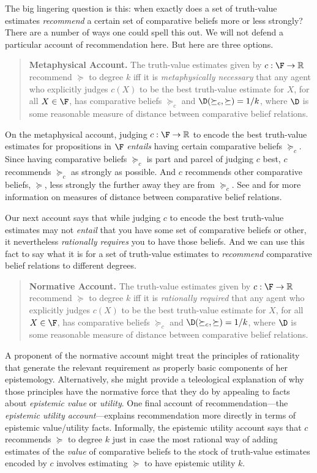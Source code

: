The big lingering question is this: when exactly does a set of truth-value estimates \textit{recommend} a certain set of comparative beliefs more or less strongly? There are a number of ways one could spell this out. We will not defend a particular account of recommendation here. But here are three options.
\begin{quote}
\textbf{Metaphysical Account.} The truth-value estimates given by $c:\F\rightarrow\mathbb{R}$ recommend $\succeq$ to degree $k$ iff it is \textit{metaphysically necessary} that any agent who explicitly judges $c(X)$ to be the best truth-value estimate for $X$, for all $X\in\F$, has comparative beliefs $\succeq_c$ and $\D(\succeq_c,\succeq)=1/k$, where $\D$ is some reasonable measure of distance between comparative belief relations. 
\end{quote}
On the metaphysical account, judging $c:\F\rightarrow\mathbb{R}$ to encode the best truth-value estimates for propositions in $\F$ \textit{entails} having certain comparative beliefs $\succeq_c$. Since having comparative beliefs $\succeq_c$ is part and parcel of judging $c$ best, $c$ recommends $\succeq_c$ as strongly as possible. And $c$ recommends other comparative beliefs, $\succeq$, less strongly the further away they are from $\succeq_c$. See \citet{Deza2009} and \citet{Fitelson2015} for more information on measures of distance between comparative belief relations.

Our next account says that while judging $c$ to encode the best truth-value estimates may not \textit{entail} that you have some set of comparative beliefs or other, it nevertheless \textit{rationally requires} you to have those beliefs. And we can use this fact to say what it is for a set of truth-value estimates to \textit{recommend} comparative belief relations to different degrees.
\begin{quote}
\textbf{Normative Account.} The truth-value estimates given by $c:\F\rightarrow\mathbb{R}$ recommend $\succeq$ to degree $k$ iff it is \textit{rationally required} that any agent who explicitly judges $c(X)$ to be the best truth-value estimate for $X$, for all $X\in\F$, has comparative beliefs $\succeq_c$ and $\D(\succeq_c,\succeq)=1/k$, where $\D$ is some reasonable measure of distance between comparative belief relations. 
\end{quote}

A proponent of the normative account might treat the principles of rationality that generate the relevant requirement as properly basic components of her epistemology. Alternatively, she might provide a teleological explanation of why those principles have the normative force that they do by appealing to facts about \textit{epistemic value} or \textit{utility}. One final account of recommendation---the \textit{epistemic utility account}---explains recommendation more directly in terms of epistemic value/utility facts. Informally, the epistemic utility account says that $c$ recommends $\succeq$ to degree $k$ just in case the most rational way of adding estimates of the \textit{value} of comparative beliefs to the stock of truth-value estimates encoded by $c$ involves estimating $\succeq$ to have epistemic utility $k$.

